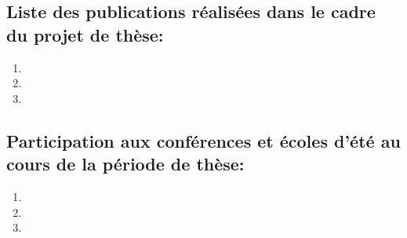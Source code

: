 \subsection*{Liste des publications réalisées dans le cadre du projet de thèse:}
\begin{enumerate}
\item 
\item 
\item 
\end{enumerate}


\subsection*{Participation aux conférences et écoles d’été au cours de la période de thèse:}
\begin{enumerate}
\item 
\item 
\item 
\end{enumerate}